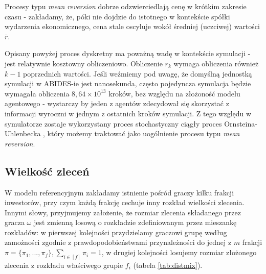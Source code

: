 Procesy typu \textit{mean reversion} dobrze odzwierciedlają cenę w krótkim zakresie czasu \cite{meanreversion} - zakładamy, że, póki nie dojdzie do istotnego w kontekście spółki wydarzenia ekonomicznego, cena stale oscyluje wokół średniej (uczciwej) wartości $\bar{r}$.

Opisany powyżej proces dyskretny ma poważną wadę w kontekście symulacji - jest relatywnie kosztowny obliczeniowo. Obliczenie $r_k$ wymaga obliczenia również $k-1$ poprzednich wartości. Jeśli weźmiemy pod uwagę, że domyślną jednostką symulacji w ABIDES-ie jest nanosekunda, często pojedyncza symulacja będzie wymagała obliczenia $8,64 \times 10^{13}$ kroków, bez względu na złożoność modelu agentowego - wystarczy by jeden z agentów zdecydował się skorzystać z informacji wyroczni w jednym z ostatnich kroków symulacji. Z tego względu w symulatorze zostaje wykorzystany proces stochastyczny ciągły proces Ornsteina-Uhlenbecka \cite{ouprocess}, który możemy traktować jako uogólnienie procesu typu \textit{mean reversion}. 
\subsection{Wielkość zleceń}
W modelu referencyjnym zakładamy istnienie pośród graczy kilku frakcji inwestorów, przy czym każdą frakcję cechuje inny rozkład wielkości zlecenia. Innymi słowy, przyjmujemy założenie, że rozmiar zlecenia składanego przez gracza $\omega$ jest zmienną losową o rozkładzie zdefiniowanym przez mieszankę rozkładów: w pierwszej kolejności przydzielamy graczowi grupę według zamożności zgodnie z prawdopodobieństwami przynależności do jednej z $m$  frakcji $\pi=\{\pi_1,...,\pi_f\},\sum_{i \in [f]} \pi_i =1$, w drugiej kolejności losujemy rozmiar złożonego zlecenia z rozkładu właściwego grupie $f_i$ (tabela \ref{tab:distmix}).

